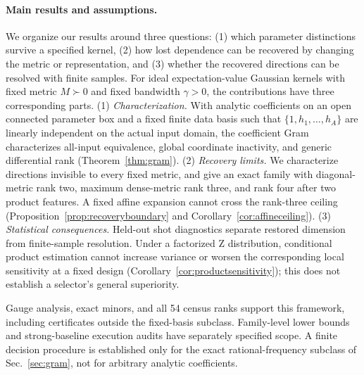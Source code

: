 \documentclass[a4paper,twocolumn,11pt,unpublished]{quantumarticle}
\begin{document}


\paragraph{Main results and assumptions.}
We organize our results around three questions: (1) which parameter
distinctions survive a specified kernel, (2) how lost dependence can
be recovered by changing the metric or representation, and (3) whether
the recovered directions can be resolved with finite samples.
For ideal expectation-value Gaussian kernels with fixed metric
$M\succ0$ and fixed bandwidth $\gamma>0$, the contributions have
three corresponding parts.
(1) \emph{Characterization.} With analytic coefficients on an open
connected parameter box and a fixed finite data basis such that
$\{1,h_1,\ldots,h_A\}$ are linearly independent on the actual input
domain, the coefficient Gram characterizes all-input equivalence,
global coordinate inactivity, and generic differential rank
(Theorem~\ref{thm:gram}).
(2) \emph{Recovery limits.} We characterize directions invisible to
every fixed metric, and give an exact family with diagonal-metric
rank two, maximum dense-metric rank three, and rank four after two
product features. A fixed affine expansion cannot cross the rank-three
ceiling (Proposition~\ref{prop:recoveryboundary} and
Corollary~\ref{cor:affineceiling}).
(3) \emph{Statistical consequences.} Held-out shot diagnostics
separate restored dimension from finite-sample resolution. Under a
factorized Z distribution, conditional product estimation cannot
increase variance or worsen the corresponding local sensitivity at
a fixed design (Corollary~\ref{cor:productsensitivity}); this does not
establish a selector's general superiority.

Gauge analysis, exact minors, and all 54 census ranks support this
framework, including certificates outside the fixed-basis subclass.
Family-level lower bounds and strong-baseline execution audits have
separately specified scope. A finite decision procedure is established
only for the exact rational-frequency subclass of Sec.~\ref{sec:gram},
not for arbitrary analytic coefficients.


\end{document}
